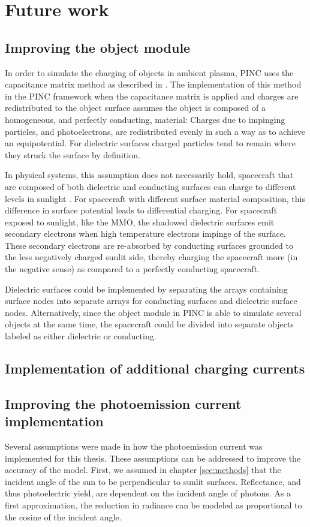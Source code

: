 \chapter{Future work}
\label{sec:future}

\section{Improving the object module}
In order to simulate the charging of objects in ambient plasma, PINC uses the capacitance matrix method as described in \parencite{Miyake2009}. The implementation of this method in the PINC framework when the capacitance matrix is applied and charges are redistributed to the object surface assumes the object is composed of a homogeneous, and perfectly conducting, material: Charges due to impinging particles, and photoelectrons, are redistributed evenly in such a way as to achieve an equipotential. For dielectric surfaces charged particles tend to remain where they struck the surface by definition.

In physical systems, this assumption does not necessarily hold, spacecraft that are composed of both dielectric and conducting surfaces can charge to different levels in sunlight \parencite{LAI2019}. For spacecraft with different surface material composition, this difference in surface potential leads to differential charging. For spacecraft exposed to sunlight, like the MMO, the shadowed dielectric surfaces emit secondary electrons when high temperature electrons impinge of the surface. These secondary electrons are re-absorbed by conducting surfaces grounded to the less negatively charged sunlit side, thereby charging the spacecraft more (in the negative sense) as compared to a perfectly conducting spacecraft. 

Dielectric surfaces could be implemented by separating the arrays containing surface nodes into separate arrays for conducting surfaces and dielectric surface nodes. Alternatively, since the object module in PINC is able to simulate several objects at the same time, the spacecraft could be divided into separate objects labeled as either dielectric or conducting.


\section{Implementation of additional charging currents}


\section{Improving the photoemission current implementation}
Several assumptions were made in how the photoemission current was implemented for this thesis. These assumptions can be addressed to improve the accuracy of the model. First, we assumed in chapter \cref{sec:methods} that the incident angle of the sun to be perpendicular to sunlit surfaces. Reflectance, and thus photoelectric yield, are dependent on the incident angle of photons. As a first approximation, the reduction in radiance can be modeled as proportional to the cosine of the incident angle. 